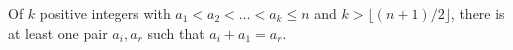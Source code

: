 Of $k$ positive integers with $a_1 < a_2 < \ldots < a_k \leq n$ and $k > \lfloor (n + 1)/2 \rfloor$, there is at least one pair $a_i, a_r$ such that $a_i + a_1 = a_r$.
